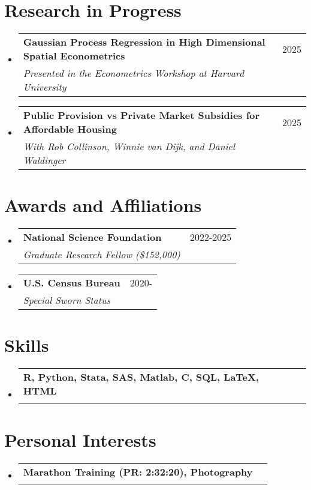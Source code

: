 \documentclass[12pt,]{article}
\makeatletter
\newcommand{\resumeSubheading}[4]{
  \vspace{-2pt}\item
    \begin{tabular*}{0.97\textwidth}[t]{l@{\extracolsep{\fill}}r}
      \textbf{#1} & #2 \\
      \textit{\small#3} & {\small #4} \\
    \end{tabular*}\vspace{-7pt}
}
\newcommand{\CC}{C\nolinebreak\hspace{-.05em}\raisebox{.3ex}{\small\bf +}\nolinebreak\hspace{-.10em}\raisebox{.3ex}{\small\bf +}}
\makeatother
\begin{document}
\section*{Research in Progress}
\begin{itemize}[leftmargin=0.09in, label={}]
\resumeSubheading
      {Gaussian Process Regression in High Dimensional Spatial Econometrics}{2025}
      {{Presented in the Econometrics Workshop at Harvard University}}{}
\resumeSubheading
      {Public Provision vs Private Market Subsidies for Affordable Housing}{2025}
      {{With Rob Collinson, Winnie van Dijk, and Daniel Waldinger}}{}
\end{itemize}

\section*{Awards and Affiliations}
\begin{itemize}[leftmargin=0.09in, label={}]
\resumeSubheading
      {National Science Foundation}{2022-2025}
      {Graduate Research Fellow (\$152,000)}{}
\resumeSubheading
      {U.S. Census Bureau}{2020-}
      {Special Sworn Status}{}
\end{itemize}
\section*{Skills}
\begin{itemize}[leftmargin=0.09in, label={}]
\resumeSubheading
      {{\normalfont R, Python, Stata, SAS, Matlab, \CC, SQL, \LaTeX, HTML}}{}
      {}{}
\end{itemize}
\section*{Personal Interests}
\begin{itemize}[leftmargin=0.09in, label={}]
\resumeSubheading
      {{\normalfont Marathon Training (PR: 2:32:20), Photography}}{}
      {}{}
\end{itemize}
\end{document}
